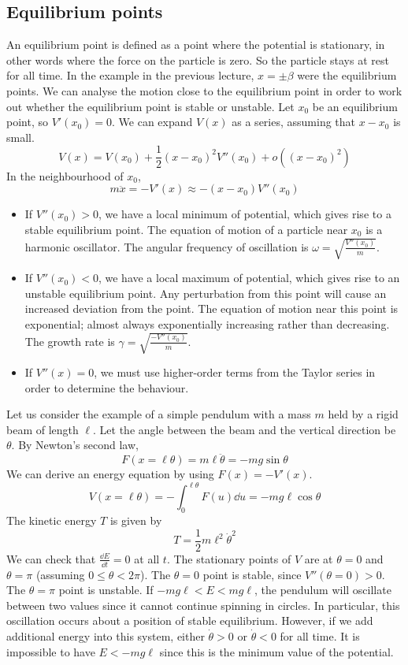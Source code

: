 \subsection{Equilibrium points}
An equilibrium point is defined as a point where the potential is stationary, in other words where the force on the particle is zero.
So the particle stays at rest for all time.
In the example in the previous lecture, \(x = \pm \beta\) were the equilibrium points.
We can analyse the motion close to the equilibrium point in order to work out whether the equilibrium point is stable or unstable.
Let \(x_0\) be an equilibrium point, so \(V'(x_0) = 0\).
We can expand \(V(x)\) as a series, assuming that \(x-x_0\) is small.
\[
	V(x) = V(x_0) + \frac{1}{2}(x-x_0)^2V''(x_0) + o((x-x_0)^2)
\]
In the neighbourhood of \(x_0\),
\[
	m\ddot x = -V'(x) \approx -(x-x_0)V''(x_0)
\]
\begin{itemize}
	\item If \(V''(x_0) > 0\), we have a local minimum of potential, which gives rise to a stable equilibrium point.
	      The equation of motion of a particle near \(x_0\) is a harmonic oscillator.
	      The angular frequency of oscillation is \(\omega = \sqrt{\frac{V''(x_0)}{m}}\).
	\item If \(V''(x_0) < 0\), we have a local maximum of potential, which gives rise to an unstable equilibrium point.
	      Any perturbation from this point will cause an increased deviation from the point.
	      The equation of motion near this point is exponential; almost always exponentially increasing rather than decreasing.
	      The growth rate is \(\gamma = \sqrt{\frac{-V''(x_0)}{m}}\).
	\item If \(V''(x) = 0\), we must use higher-order terms from the Taylor series in order to determine the behaviour.
\end{itemize}
Let us consider the example of a simple pendulum with a mass \(m\) held by a rigid beam of length \(\ell\).
Let the angle between the beam and the vertical direction be \(\theta\).
By Newton's second law,
\[
	F(x = \ell \theta) = m \ell \ddot \theta = -mg \sin \theta
\]
We can derive an energy equation by using \(F(x) = -V'(x)\).
\[
	V(x = \ell \theta) = -\int_0^{\ell\theta} F(u) \dd{u} = -mg \ell \cos \theta
\]
The kinetic energy \(T\) is given by
\[
	T = \frac{1}{2}m\ell^2\dot\theta^2
\]
We can check that \(\frac{\dd{E}}{\dd{t}} = 0\) at all \(t\).
The stationary points of \(V\) are at \(\theta = 0\) and \(\theta = \pi\) (assuming \(0 \leq \theta < 2\pi\)).
The \(\theta=0\) point is stable, since \(V''(\theta = 0) > 0\).
The \(\theta=\pi\) point is unstable.
If \(-mg\ell < E < mg\ell\), the pendulum will oscillate between two values since it cannot continue spinning in circles.
In particular, this oscillation occurs about a position of stable equilibrium.
However, if we add additional energy into this system, either \(\dot\theta > 0\) or \(\dot\theta < 0\) for all time.
It is impossible to have \(E < -mg\ell\) since this is the minimum value of the potential.

